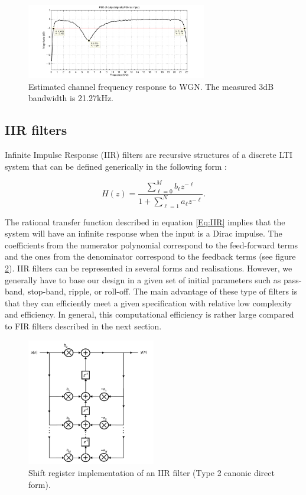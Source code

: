 \documentclass[12pt,a4paper,openright]{report}
\begin{document}
\begin{figure}[H]
\centering
\includegraphics[width=0.7\textwidth]{ChannelResponse.pdf}
\caption[Estimated channel frequency response to WGN]{Estimated channel frequency response to WGN. The measured 3dB bandwidth is 21.27kHz.}
\label{fig:channelresp}
\end{figure}


\subsection{IIR filters}
Infinite Impulse Response (IIR) filters are recursive structures of a discrete LTI system that can be defined generically in the following form \cite{DSPDiniz}:

\begin{equation}\label{Eq:IIR}
H\left( z \right) = \frac{{\sum\limits_{\ell  = 0}^M {{b_\ell }{z^{ - \ell }}} }}{{1 + \sum\limits_{\ell = 1}^N {{a_\ell }{z^{ - \ell }}} }}.
\end{equation}

 The rational transfer function described in equation \ref{Eq:IIR} implies that the system will have an infinite response when the input is a Dirac impulse. The coefficients from the numerator polynomial correspond to the feed-forward terms and the ones from the denominator correspond to the feedback terms (see figure \ref{fig:IIRimpl}). IIR filters can be represented in several forms and realisations. However, we generally have to base our design in a given set of initial parameters such as pass-band, stop-band, ripple, or roll-off. The main advantage of these type of filters is that they can efficiently meet a given specification with relative low complexity and efficiency.  In general, this  computational efficiency is rather large compared to FIR filters described in the next section.
 
  \begin{figure}[H]
   \centering
     \includegraphics[width=0.5\textwidth]{IIRfilter.png}
     \caption[Shift register implementation of an IIR filter]{Shift register implementation of an IIR filter (Type 2 canonic direct form)\cite{DSPDiniz}.}
     \label{fig:IIRimpl}
 \end{figure}  
\end{document}
